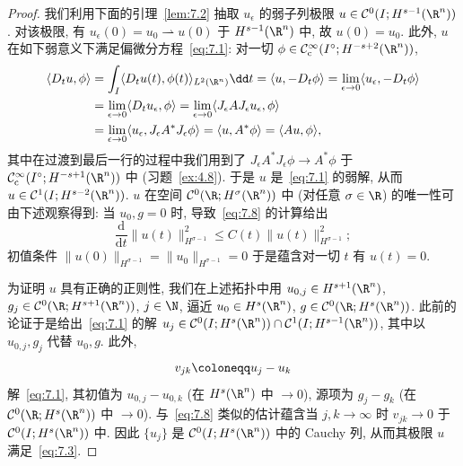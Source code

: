 \begin{proof}
我们利用下面的引理~\ref{lem:7.2} 抽取 $u_\epsilon$ 的弱子列极限 $u \in \mathcal{C}^0(I; H^{s-1}(\R^n))$. 对该极限, 有 $u_\epsilon(0) = u_0 \rightharpoonup u(0)$ 于 $H^{s-1}(\R^n)$ 中, 故 $u(0) = u_0$. 此外, $u$ 在如下弱意义下满足偏微分方程~\eqref{eq:7.1}: 对一切 $\phi \in \SmoothComp(I^\circ; H^{-s+2}(\R^n))$,
\begin{equation}\label{eq:7.10}
    \begin{aligned}
        \langle D_t u, \phi \rangle
        &= \int_I \langle D_t u(t), \phi(t) \rangle_{L^2(\R^n)} \dd t
         = \langle u, -D_t \phi \rangle = \lim_{\epsilon \to 0} \langle u_\epsilon, -D_t \phi \rangle \\
        &= \lim_{\epsilon \to 0} \langle D_t u_\epsilon, \phi \rangle
         = \lim_{\epsilon \to 0} \langle J_\epsilon A J_\epsilon u_\epsilon, \phi \rangle \\
        &= \lim_{\epsilon \to 0} \langle u_\epsilon, J_\epsilon A^* J_\epsilon \phi \rangle
         = \langle u, A^* \phi \rangle = \langle A u, \phi \rangle,
    \end{aligned}
\end{equation}
其中在过渡到最后一行的过程中我们用到了 $J_\epsilon A^* J_\epsilon \phi \to A^* \phi$ 于 $\SmoothComp(I^\circ; H^{-s+1}(\R^n))$ 中 (习题~\ref{ex:4.8}). 于是 $u$ 是~\eqref{eq:7.1} 的弱解, 从而 $u \in \mathcal{C}^1(I; H^{s-2}(\R^n))$. $u$ 在空间 $\mathcal{C}^0(\R; H^\sigma(\R^n))$ 中 (对任意 $\sigma \in \R$) 的唯一性可由下述观察得到: 当 $u_0, g = 0$ 时, 导致~\eqref{eq:7.8} 的计算给出
\begin{equation*}
    \frac{\mathrm{d}}{\mathrm{d} t} \| u(t) \|_{H^{\sigma-1}}^2 \le C(t) \| u(t) \|_{H^{\sigma-1}}^2;
\end{equation*}
初值条件 $\| u(0) \|_{H^{\sigma-1}} = \| u_0 \|_{H^{\sigma-1}} = 0$ 于是蕴含对一切 $t$ 有 $u(t) = 0$.

为证明 $u$ 具有正确的正则性, 我们在上述拓扑中用 $u_{0, j} \in H^{s+1}(\R^n)$, $g_j \in \mathcal{C}^0(\R; H^{s+1}(\R^n))$, $j \in \N$, 逼近 $u_0 \in H^s(\R^n)$, $g \in \mathcal{C}^0(\R; H^s(\R^n))$. 此前的论证于是给出~\eqref{eq:7.1} 的解 $u_j \in \mathcal{C}^0(I; H^s(\R^n)) \cap \mathcal{C}^1(I; H^{s-1}(\R^n))$, 其中以 $u_{0, j}, g_j$ 代替 $u_0, g$. 此外,
\begin{equation}\label{eq:7.11}
    v_{jk} \defeq u_j - u_k
\end{equation}
解~\eqref{eq:7.1}, 其初值为 $u_{0, j} - u_{0, k}$ (在 $H^s(\R^n)$ 中 $\to 0$), 源项为 $g_j - g_k$ (在 $\mathcal{C}^0(\R; H^s(\R^n))$ 中 $\to 0$). 与~\eqref{eq:7.8} 类似的估计蕴含当 $j, k \to \infty$ 时 $v_{jk} \to 0$ 于 $\mathcal{C}^0(I; H^s(\R^n))$ 中. 因此 $\{u_j\}$ 是 $\mathcal{C}^0(I; H^s(\R^n))$ 中的 Cauchy 列, 从而其极限 $u$ 满足~\eqref{eq:7.3}.
\end{proof}


